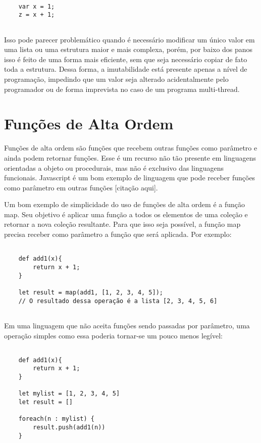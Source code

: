 \begin{lstlisting}[caption={Exemplo de Código Imutável},label=imutablevar]

    var x = 1;
    z = x + 1;


\end{lstlisting}

Isso pode parecer problemático quando é necessário 
modificar um único valor em uma lista ou uma estrutura 
maior e mais complexa, porém, por baixo dos panos isso 
é feito de uma forma mais eficiente, sem que seja 
necessário copiar de fato toda a estrutura. Dessa forma, 
a imutabilidade está presente apenas a nível de 
programação, impedindo que um valor seja alterado 
acidentalmente pelo programador ou de forma imprevista 
no caso de um programa multi-thread.


\section{Funções de Alta Ordem}

Funções de alta ordem são funções que recebem 
outras funções como parâmetro e ainda podem 
retornar funções. Esse é um recurso 
não tão presente em linguagens orientadas a 
objeto ou procedurais, mas não é exclusivo das 
linguagens funcionais. Javascript é um bom 
exemplo de linguagem que pode receber funções 
como parâmetro em outras funções [citação aqui].

Um bom exemplo de simplicidade do uso de 
funções de alta ordem é a função map. Seu objetivo 
é aplicar uma função a todos os elementos de uma 
coleção e retornar a nova coleção resultante. 
Para que isso seja possível, a função map precisa 
receber como parâmetro a função que será aplicada. 
Por exemplo:

\begin{lstlisting}[caption={Exemplo de Função de Alta Ordem},label=hof]

    def add1(x){
        return x + 1;
    }

    let result = map(add1, [1, 2, 3, 4, 5]);
    // O resultado dessa operação é a lista [2, 3, 4, 5, 6]
        

\end{lstlisting}

Em uma linguagem que não aceita funções sendo 
passadas por parâmetro, uma operação simples como 
essa poderia tornar-se um pouco menos legível:

\begin{lstlisting}[caption={Exemplo sem Funções de Alta Ordem},label=nohof]

    def add1(x){
        return x + 1;
    }

    let mylist = [1, 2, 3, 4, 5]
    let result = []

    foreach(n : mylist) {
        result.push(add1(n))
    }

\end{lstlisting}

